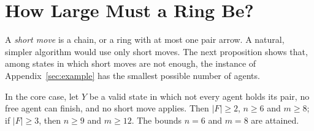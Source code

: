 \documentclass[runningheads,11pt]{llncs}
\begin{document}
\section{How Large Must a Ring Be?}\label{app:size}

A \emph{short move} is a chain, or a ring with at most one pair arrow. A natural, simpler algorithm would use only short moves. The next proposition shows that, among states in which short moves are not enough, the instance of Appendix~\ref{sec:example} has the smallest possible number of agents.

\begin{proposition}\label{prop:short}
In the core case, let $Y$ be a valid state in which not every agent holds its pair, no free agent can finish, and no short move applies. Then $|F|\ge2$, $n\ge6$ and $m\ge8$; if $|F|\ge3$, then $n\ge9$ and $m\ge12$. The bounds $n=6$ and $m=8$ are attained.
\end{proposition}
\end{document}
